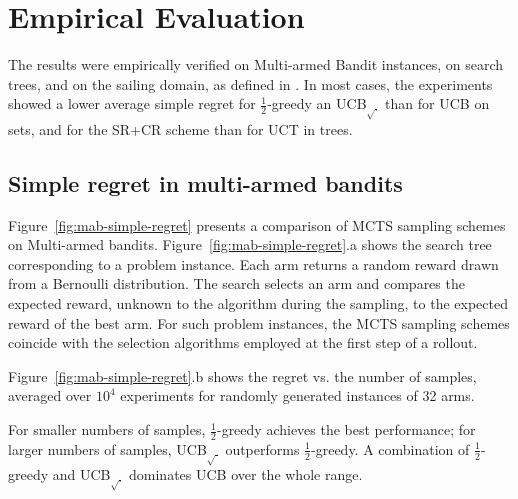 \documentclass[letterpaper]{article}
\begin{document}
\section{Empirical Evaluation}
\label{sec:emp}

The results were empirically verified on Multi-armed Bandit instances,
on search trees, and on the sailing domain, as defined in
\cite{Kocsis.uct}. In most cases, the experiments showed a lower average
simple regret for $\frac 1 2$-greedy an UCB$_{\sqrt{\cdot}}$ than for
UCB on sets, and for the SR+CR scheme than for UCT in trees.

\subsection{Simple regret in multi-armed bandits}
\label{sec:emp-mab}

Figure~\ref{fig:mab-simple-regret} presents a comparison of MCTS sampling
schemes on Multi-armed bandits. Figure~\ref{fig:mab-simple-regret}.a shows the search tree
corresponding to a problem instance. Each arm returns a random reward
drawn from a Bernoulli distribution. The search selects an arm
and compares the expected reward, unknown to the algorithm during the
sampling, to the expected reward of the best arm. For such problem
instances, the MCTS sampling schemes coincide with the selection
algorithms employed at the first step of a rollout.

Figure~\ref{fig:mab-simple-regret}.b shows the regret
vs. the number of samples, averaged over $10^4$ experiments for
randomly generated instances of 32 arms. 

For smaller numbers of samples, $\frac 1 2$-greedy achieves the best
performance; for larger numbers of samples, UCB$_{\sqrt{\cdot}}$
outperforms $\frac 1 2$-greedy. A combination of $\frac 1
2$-greedy  and UCB$_{\sqrt{\cdot}}$ dominates UCB over the
whole range.
\end{document}
